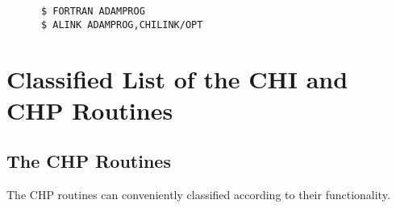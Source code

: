 \begin{verbatim}
      $ FORTRAN ADAMPROG
      $ ALINK ADAMPROG,CHILINK/OPT
\end{verbatim}

\appendix

\newpage
\section {Classified List of the CHI and CHP Routines}

\subsection {The CHP Routines}

The CHP routines can conveniently classified according to their functionality.
 
